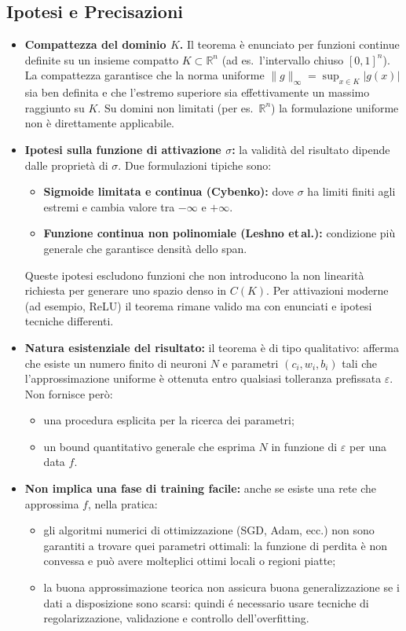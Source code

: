 \documentclass[a4paper,12pt]{report}
\begin{document}
	\subsection{Ipotesi e Precisazioni}
	\begin{itemize}
		\item \textbf{Compattezza del dominio \(K\).} Il teorema è enunciato per funzioni continue definite su un insieme compatto \(K\subset\mathbb{R}^n\) (ad es.\ l'intervallo chiuso \([0,1]^n\)). La compattezza garantisce che la norma uniforme \(\|g\|_\infty=\sup_{x\in K}|g(x)|\) sia ben definita e che l'estremo superiore sia effettivamente un massimo raggiunto su \(K\). Su domini non limitati (per es.\ \(\mathbb{R}^n\)) la formulazione uniforme non è direttamente applicabile.
		
		\item \textbf{Ipotesi sulla funzione di attivazione \(\sigma\):} la validità del risultato dipende dalle proprietà di \(\sigma\). Due formulazioni tipiche sono:
		\begin{itemize}
			\item \textbf{Sigmoide limitata e continua (Cybenko):} dove \(\sigma\) ha limiti finiti agli estremi e cambia valore tra \(-\infty\) e \(+\infty\).
			\item \textbf{Funzione continua non polinomiale (Leshno et\,al.):} condizione più generale che garantisce densità dello span.
		\end{itemize}
		Queste ipotesi escludono funzioni che non introducono la non linearità richiesta per generare uno spazio denso in \(C(K)\). Per attivazioni moderne (ad esempio, ReLU) il teorema rimane valido ma con enunciati e ipotesi tecniche differenti.
		
		\item \textbf{Natura esistenziale del risultato:} il teorema è di tipo qualitativo: afferma che esiste un numero finito di neuroni \(N\) e parametri \((c_i,w_i,b_i)\) tali che l'approssimazione uniforme è ottenuta entro qualsiasi tolleranza prefissata \(\varepsilon\). Non fornisce però:
		\begin{itemize}
			\item una procedura esplicita per la ricerca dei parametri;
			\item un bound quantitativo generale che esprima \(N\) in funzione di \(\varepsilon\) per una data \(f\).
		\end{itemize}
		
		\item \textbf{Non implica una fase di training facile:} anche se esiste una rete che approssima \(f\), nella pratica:
		\begin{itemize}
			\item gli algoritmi numerici di ottimizzazione (SGD, Adam, ecc.) non sono garantiti a trovare quei parametri ottimali: la funzione di perdita è non convessa e può avere molteplici ottimi locali o regioni piatte;
			\item la buona approssimazione teorica non assicura buona generalizzazione se i dati a disposizione sono scarsi: quindi é necessario usare tecniche di regolarizzazione, validazione e controllo dell'overfitting.
		\end{itemize}
	\end{itemize}
	
\end{document}
